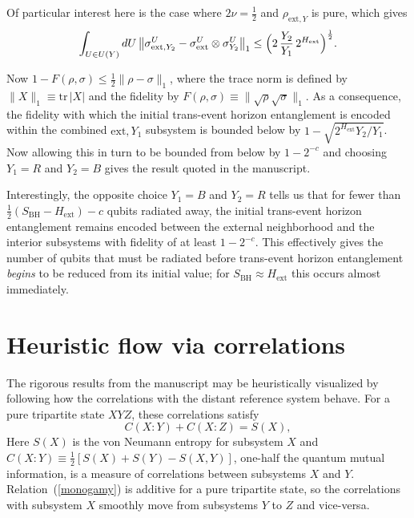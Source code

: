 \documentclass[aps,12pt]{revtex4}
\begin{document}
Of particular interest here is the case where $2\nu=\frac{1}{2}$ and
$\rho_{\text{ext},Y}$ is pure, which gives
\begin{equation}
\int_{U\in U(Y)}dU\,\bigl\| \sigma_{\text{ext},Y_2}^U-
\sigma_{\text{ext}}^U\otimes \sigma_{Y_2}^U\bigr\|_1
\le \Bigl(2\,\frac{Y_2}{Y_1}\,2^{H_{\text{ext}}}\Bigr)^{\frac{1}{2}}.
\end{equation}

Now
$1-F(\rho,\sigma) \le \frac{1}{2}\|\rho-\sigma\|_1$, where the trace
norm is defined by $\|X\|_1\equiv \text{tr}\, |X|$ and the fidelity
by $F(\rho,\sigma)\equiv \|\sqrt{\rho}\sqrt{\sigma}\|_1$.
As a consequence, the fidelity with which the initial trans-event
horizon entanglement is encoded within the combined $\text{ext},Y_1$
subsystem is bounded below by $1-\sqrt{2^{H_{\text{ext}}} Y_2/Y_1}$.
Now allowing this in turn to be bounded from below by $1-2^{-c}$ and
choosing $Y_1=R$ and $Y_2=B$ gives the result quoted in the manuscript.

Interestingly, the opposite choice $Y_1=B$ and $Y_2=R$ tells us that
for fewer than $\frac{1}{2}(S_{\text{BH}}-H_{\text{ext}})-c$ qubits 
radiated away, the initial trans-event horizon entanglement remains
encoded between the external neighborhood and the interior subsystems
with fidelity of at least $1-2^{-c}$. This effectively gives the
number of qubits that must be radiated before trans-event horizon
entanglement {\it begins\/} to be reduced from its initial value; for
$S_{\text{BH}}\approx H_{\text{ext}}$ this occurs almost immediately.

\section{Heuristic flow via correlations}
\label{heuristic}

The rigorous results from the manuscript may be heuristically visualized
by following how the correlations with the distant reference system
behave. For a pure tripartite state $XYZ$, these correlations satisfy
\begin{equation}
C(X\!:\!Y)+C(X\!:\!Z) = S(X), \label{monogamy}
\end{equation}
Here $S(X)$ is the von Neumann entropy for subsystem $X$ and
$C(X\!:\!Y)\equiv\frac{1}{2}[S(X)+S(Y)-S(X,Y)]$, one-half the quantum
mutual information, is a measure of correlations between subsystems
$X$ and $Y$. Relation~(\ref{monogamy}) is additive for a pure
tripartite state, so the correlations with subsystem $X$ smoothly
move from subsystems $Y$ to $Z$ and vice-versa.
\end{document}
